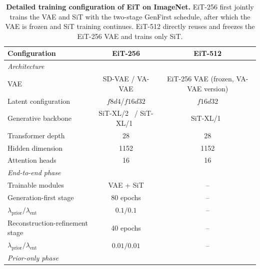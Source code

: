 \begin{table}[t]
\centering
\caption{
\textbf{Detailed training configuration of EiT on ImageNet.}
EiT-256 first jointly trains the VAE and SiT with the two-stage GenFirst
schedule, after which the VAE is frozen and SiT training continues.
EiT-512 directly reuses and freezes the EiT-256 VAE and trains only SiT.
}
\label{tab:eit_details}
\scriptsize
\setlength{\tabcolsep}{5pt}
\renewcommand{\arraystretch}{1.10}

\begin{tabular}{lcc}
\toprule
\textbf{Configuration}
& \textbf{EiT-256}
& \textbf{EiT-512} \\
\midrule

\multicolumn{3}{l}{\textit{Architecture}} \\
\midrule

VAE
& SD-VAE / VA-VAE
& EiT-256 VAE (frozen, VA-VAE version) \\

Latent configuration
& $f8d4$/$f16d32$
& $f16d32$ \\

Generative backbone
& SiT-XL/2~\cite{sit} / SiT-XL/1~\cite{sit}
& SiT-XL/1~\cite{sit} \\

Transformer depth
& 28
& 28 \\

Hidden dimension
& 1152
& 1152 \\

Attention heads
& 16
& 16 \\

\midrule
\multicolumn{3}{l}{\textit{End-to-end phase}} \\
\midrule

Trainable modules
& VAE + SiT
& -- \\

Generation-first stage
& 80 epochs
& -- \\

$\lambda_{\mathrm{prior}} / \lambda_{\mathrm{ent}}$
& $0.1 / 0.1$
& -- \\

Reconstruction-refinement stage
& 40 epochs
& -- \\

$\lambda_{\mathrm{prior}} / \lambda_{\mathrm{ent}}$
& $0.01 / 0.01$
& -- \\

\midrule
\multicolumn{3}{l}{\textit{Prior-only phase}} \\
\midrule


\end{tabular}
\end{table}
